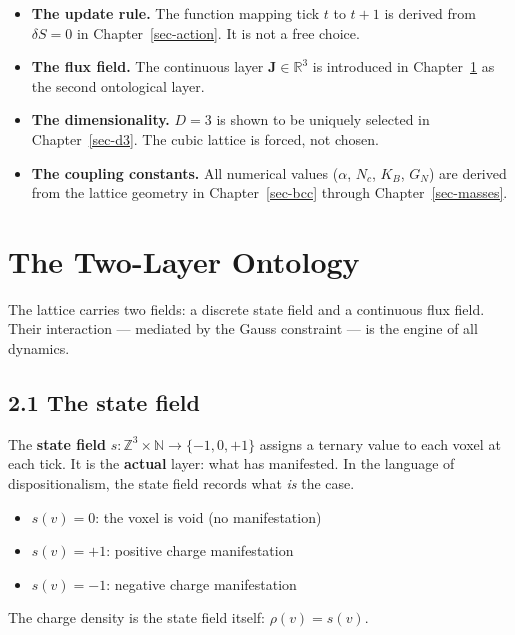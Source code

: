 \documentclass[
  11pt,
  letterpaper,
  twoside,
  openright]{book}
\providecommand{\tightlist}{%
  \setlength{\itemsep}{0pt}\setlength{\parskip}{0pt}}
\begin{document}
\begin{itemize}
\tightlist
\item
  \textbf{The update rule.} The function mapping tick \(t\) to \(t+1\)
  is derived from \(\delta S = 0\) in Chapter~\ref{sec-action}. It is
  not a free choice.
\item
  \textbf{The flux field.} The continuous layer
  \(\mathbf{J} \in \mathbb{R}^3\) is introduced in
  Chapter~\ref{sec-ontology} as the second ontological layer.
\item
  \textbf{The dimensionality.} \(D = 3\) is shown to be uniquely
  selected in Chapter~\ref{sec-d3}. The cubic lattice is forced, not
  chosen.
\item
  \textbf{The coupling constants.} All numerical values (\(\alpha\),
  \(N_c\), \(K_B\), \(G_N\)) are derived from the lattice geometry in
  Chapter~\ref{sec-bcc} through Chapter~\ref{sec-masses}.
\end{itemize}

\chapter{The Two-Layer Ontology}\label{sec-ontology}

The lattice carries two fields: a discrete state field and a continuous
flux field. Their interaction --- mediated by the Gauss constraint ---
is the engine of all dynamics.

\section{2.1 The state field}\label{the-state-field}

The \textbf{state field}
\(s : \mathbb{Z}^3 \times \mathbb{N} \to \{-1, 0, +1\}\) assigns a
ternary value to each voxel at each tick. It is the \textbf{actual}
layer: what has manifested. In the language of dispositionalism, the
state field records what \emph{is} the case.

\begin{itemize}
\tightlist
\item
  \(s(v) = 0\): the voxel is void (no manifestation)
\item
  \(s(v) = +1\): positive charge manifestation
\item
  \(s(v) = -1\): negative charge manifestation
\end{itemize}

The charge density is the state field itself: \(\rho(v) = s(v)\).
\end{document}
